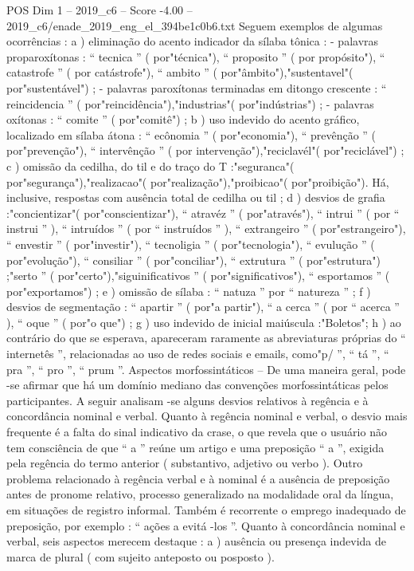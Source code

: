 \begin{textsample}{POS Dim 1 – 2019\_c6 – Score -4.00 – 2019\_c6/enade\_2019\_eng\_el\_394be1c0b6.txt}
Seguem exemplos de algumas ocorrências : a ) eliminação do acento indicador da sílaba tônica : - palavras proparoxítonas : “ tecnica ” ( por"técnica"), “ proposito ” ( por propósito"), “ catastrofe ” ( por catástrofe"), “ ambito ” ( por"âmbito"),"sustentavel"( por"sustentável") ; - palavras paroxítonas terminadas em ditongo crescente : “ reincidencia ” ( por"reincidência"),"industrias"( por"indústrias") ; - palavras oxítonas : “ comite ” ( por"comitê") ; b ) uso indevido do acento gráfico, localizado em sílaba átona : “ ecônomia ” ( por"economia"), “ prevênção ” ( por"prevenção"), “ intervênção ” ( por intervenção"),"reciclavél"( por"reciclável") ; c ) omissão da cedilha, do til e do traço do T :"seguranca"( por"segurança"),"realizacao"( por"realização"),"proibicao"( por"proibição").
Há, inclusive, respostas com ausência total de cedilha ou til ; d ) desvios de grafia :"concientizar"( por"conscientizar"), “ atravéz ” ( por"através"), “ intrui ” ( por “ instrui ” ), “ intruídos ” ( por “ instruídos ” ), “ extrangeiro ” ( por"estrangeiro"), “ envestir ” ( por"investir"), “ tecnoligia ” ( por"tecnologia"), “ evulução ” ( por"evolução"), “ consiliar ” ( por"conciliar"), “ extrutura ” ( por"estrutura") ;"serto ” ( por"certo"),"siguinificativos ” ( por"significativos"), “ esportamos ” ( por"exportamos") ; e ) omissão de sílaba : “ natuza ” por “ natureza ” ; f ) desvios de segmentação : “ apartir ” ( por"a partir"), “ a cerca ” ( por “ acerca ” ), “ oque ” ( por"o que") ; g ) uso indevido de inicial maiúscula :"Boletos"; h ) ao contrário do que se esperava, apareceram raramente as abreviaturas próprias do “ internetês ”, relacionadas ao uso de redes sociais e emails, como"p/ ”, “ tá ”, “ pra ”, “ pro ”, “ prum ”.
Aspectos morfossintáticos – De uma maneira geral, pode -se afirmar que há um domínio mediano das convenções morfossintáticas pelos participantes.
A seguir analisam -se alguns desvios relativos à regência e à concordância nominal e verbal.
Quanto à regência nominal e verbal, o desvio mais frequente é a falta do sinal indicativo da crase, o que revela que o usuário não tem consciência de que “ a ” reúne um artigo e uma preposição “ a ”, exigida pela regência do termo anterior ( substantivo, adjetivo ou verbo ).
Outro problema relacionado à regência verbal e à nominal é a ausência de preposição antes de pronome relativo, processo generalizado na modalidade oral da língua, em situações de registro informal.
Também é recorrente o emprego inadequado de preposição, por exemplo : “ ações a evitá -los ”.
Quanto à concordância nominal e verbal, seis aspectos merecem destaque : a ) ausência ou presença indevida de marca de plural ( com sujeito anteposto ou posposto ).

\end{textsample}
